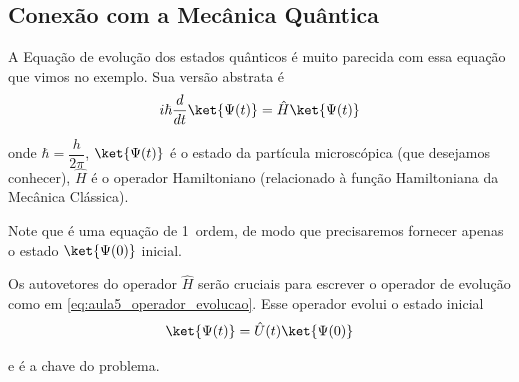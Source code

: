 \subsection*{Conexão com a Mecânica Quântica}

A Equação de evolução dos estados quânticos é muito parecida com essa equação que vimos no exemplo. Sua versão abstrata é
\begin{equation}
    i\hbar \frac{d}{dt} \ket{\Psi(t)} = \hat{H} \ket{\Psi(t)}
    \label{eq:aula5_schrodinger}
\end{equation}

onde $\hbar = \dfrac{h}{2\pi}$, $\ket{\Psi(t)}$ é o estado da partícula microscópica (que desejamos conhecer), $\hat{H}$ é o operador Hamiltoniano (relacionado à função Hamiltoniana da Mecânica Clássica).

Note que é uma equação de 1\textordfeminine\ ordem, de modo que precisaremos fornecer apenas o estado $\ket{\Psi(0)}$ inicial.

Os autovetores do operador $\hat{H}$ serão cruciais para escrever o operador de evolução como em \eqref{eq:aula5_operador_evolucao}. Esse operador evolui o estado inicial
\begin{equation}
    \ket{\Psi(t)} = \hat{U}(t) \ket{\Psi(0)}
\end{equation}

e é a chave do problema.
